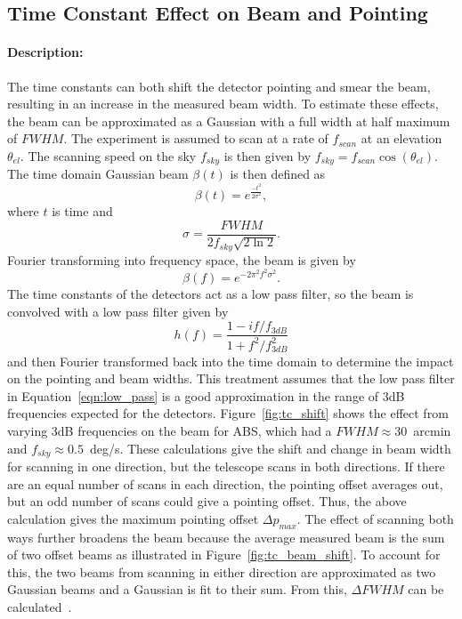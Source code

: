 \subsection{Time Constant Effect on Beam and Pointing}

\paragraph{Description:}
The time constants can both shift the detector pointing and smear the beam, resulting in an increase in the measured beam width. To estimate these effects, the beam can be approximated as a Gaussian with a full width at half maximum of $FWHM$. The experiment is assumed to scan at a rate of $f_{scan}$ at an elevation $\theta_{el}$. The scanning speed on the sky $f_{sky}$ is then given by $f_{sky}=f_{scan}\cos{(\theta_{el})}$. The time domain Gaussian beam $\beta (t)$ is then defined as
\begin{equation}
\beta (t)=e^{\frac{-t^2}{2\sigma^2}},
\end{equation}
where $t$ is time and 
\begin{equation}
\sigma=\frac{FWHM}{2f_{sky}\sqrt{2\ln2}}.
\end{equation}
Fourier transforming into frequency space, the beam is given by 
\begin{equation}
\beta (f)=e^{-2 \pi^2 f^2 \sigma^2}.
\end{equation}
The time constants of the detectors act as a low pass filter, so the beam is convolved with a low pass filter given by
\begin{equation}\label{eqn:low_pass}
h(f)=\frac{1-if/f_{3dB}}{1+f^2/f_{3dB}^2}
\end{equation}
and then Fourier transformed back into the time domain to determine the impact on the pointing and beam widths. This treatment assumes that the low pass filter in Equation~\ref{eqn:low_pass} is a good approximation in the range of 3dB frequencies expected for the detectors. Figure~\ref{fig:tc_shift} shows the effect from varying 3dB frequencies on the beam for ABS, which had a $FWHM \approx 30$~arcmin and $f_{sky}\approx 0.5$~deg/s. These calculations give the shift and change in beam width for scanning in one direction, but the telescope scans in both directions. If there are an equal number of scans in each direction, the pointing offset averages out, but an odd number of scans could give a pointing offset. Thus, the above calculation gives the maximum pointing offset $\Delta p_{max}$. The effect of scanning both ways further broadens the beam because the average measured beam is the sum of two offset beams as illustrated in Figure~\ref{fig:tc_beam_shift}. To account for this, the two beams from scanning in either direction are approximated as two Gaussian beams and a Gaussian is fit to their sum. From this, $\Delta FWHM$ can be calculated~\cite{Simon_Thesis_2016}. 

